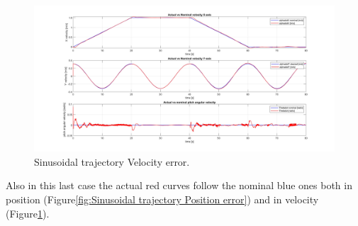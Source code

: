 \begin{figure}
    \centering
    \includegraphics[width=1\linewidth]{Images/sine trajectory/Velocity_error.jpg}
    \caption{Sinusoidal trajectory Velocity error.}
    \label{fig:Sinusoidal trajectory Velocity error}
\end{figure}

Also in this last case the actual red curves follow the nominal blue ones both in position (Figure\ref{fig:Sinusoidal trajectory Position error}) and in velocity (Figure\ref{fig:Sinusoidal trajectory Velocity error}). 




